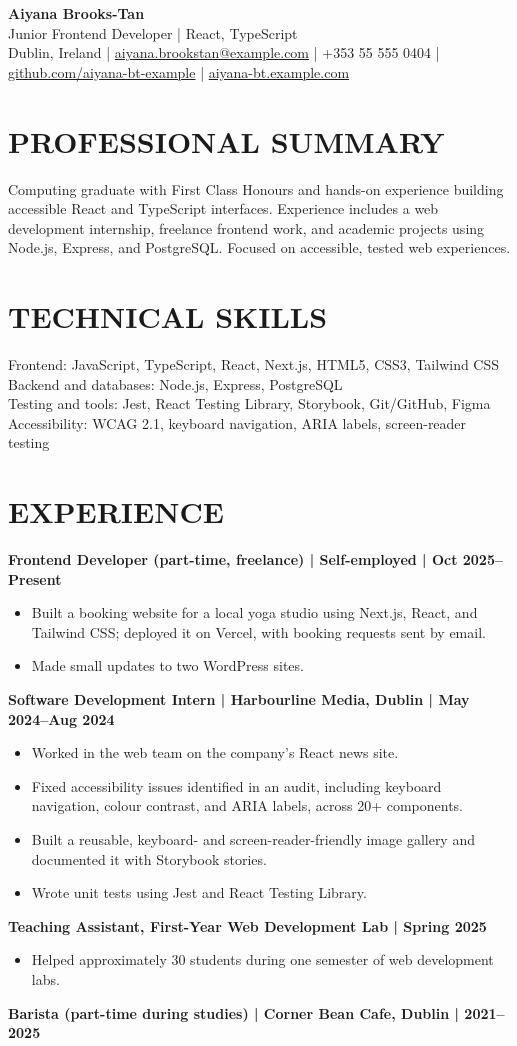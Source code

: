 \documentclass[11pt,a4paper]{article}
\newcommand{\cvsection}[1]{\section*{#1}}
\begin{document}
\begin{center}
{\Huge\bfseries\color{primarycolor} Aiyana Brooks-Tan}\\[0.35em]
{\large Junior Frontend Developer | React, TypeScript}\\[0.25em]
Dublin, Ireland | \href{mailto:aiyana.brookstan@example.com}{aiyana.brookstan@example.com} | +353 55 555 0404 | \url{github.com/aiyana-bt-example} | \url{aiyana-bt.example.com}
\end{center}
\vspace{0.5em}

\cvsection{PROFESSIONAL SUMMARY}
Computing graduate with First Class Honours and hands-on experience building accessible React and TypeScript interfaces. Experience includes a web development internship, freelance frontend work, and academic projects using Node.js, Express, and PostgreSQL. Focused on accessible, tested web experiences.

\cvsection{TECHNICAL SKILLS}
Frontend: JavaScript, TypeScript, React, Next.js, HTML5, CSS3, Tailwind CSS\\
Backend and databases: Node.js, Express, PostgreSQL\\
Testing and tools: Jest, React Testing Library, Storybook, Git/GitHub, Figma\\
Accessibility: WCAG 2.1, keyboard navigation, ARIA labels, screen-reader testing

\cvsection{EXPERIENCE}
\textbf{Frontend Developer (part-time, freelance) | Self-employed | Oct 2025--Present}
\begin{itemize}
\item Built a booking website for a local yoga studio using Next.js, React, and Tailwind CSS; deployed it on Vercel, with booking requests sent by email.
\item Made small updates to two WordPress sites.
\end{itemize}
\textbf{Software Development Intern | Harbourline Media, Dublin | May 2024--Aug 2024}
\begin{itemize}
\item Worked in the web team on the company's React news site.
\item Fixed accessibility issues identified in an audit, including keyboard navigation, colour contrast, and ARIA labels, across 20+ components.
\item Built a reusable, keyboard- and screen-reader-friendly image gallery and documented it with Storybook stories.
\item Wrote unit tests using Jest and React Testing Library.
\end{itemize}
\textbf{Teaching Assistant, First-Year Web Development Lab | Spring 2025}
\begin{itemize}
\item Helped approximately 30 students during one semester of web development labs.
\end{itemize}
\textbf{Barista (part-time during studies) | Corner Bean Cafe, Dublin | 2021--2025}
\end{document}
